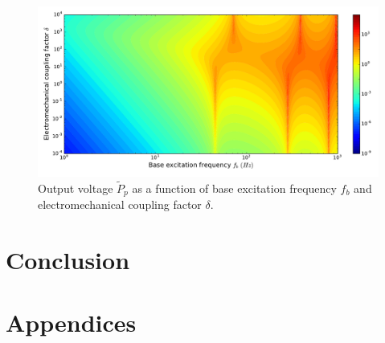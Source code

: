 \documentclass{article}
\begin{document}
\begin{figure}[!htbp]
    \centering
    \includegraphics[width=\textwidth]{./img_eig_asy/fig_sol_analytic_out_pow_contour}
    \caption{Output voltage $\tilde{P}_p$ as a function of base excitation frequency $f_b$ and electromechanical coupling factor $\delta$.}
    \label{fig:fig_sol_analytic_out_pow_contour}
\end{figure}










\section{Conclusion}



















\section*{Appendices}
\end{document}
